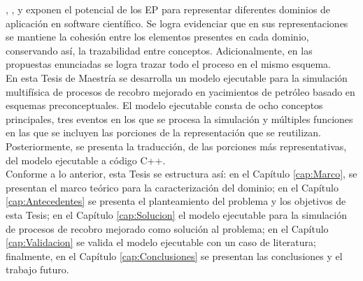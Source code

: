 \cite{norena2018timrep}, \cite{norena2018det}, \cite{norena2018bs} y \cite{norena2018ruido} exponen el potencial de los EP para representar diferentes dominios de aplicación en software científico. Se logra evidenciar que en sus representaciones se mantiene la cohesión entre los elementos presentes en cada dominio, conservando así, la trazabilidad entre conceptos. Adicionalmente, en las propuestas enunciadas se logra trazar todo el proceso en el mismo esquema.\\

En esta Tesis de Maestría se desarrolla un modelo ejecutable para la simulación multifísica de procesos de recobro mejorado en yacimientos de petróleo basado en esquemas preconceptuales. El modelo ejecutable consta de ocho conceptos principales, tres eventos en los que se procesa la simulación y múltiples funciones en las que se incluyen las porciones de la representación que se reutilizan. Posteriormente, se presenta la traducción, de las porciones más representativas, del modelo ejecutable a código C++.\\

Conforme a lo anterior, esta Tesis se estructura así: en el Capítulo \ref{cap:Marco}, se presentan el marco teórico para la caracterización del dominio; en el Capítulo \ref{cap:Antecedentes} se presenta el planteamiento del problema y los objetivos de esta Tesis; en el Capítulo \ref{cap:Solucion} el modelo ejecutable para la simulación de procesos de recobro mejorado como solución al problema; en el Capítulo \ref{cap:Validacion} se valida el modelo ejecutable con un caso de literatura; finalmente, en el Capítulo \ref{cap:Conclusiones} se presentan las conclusiones y el trabajo futuro.\\





